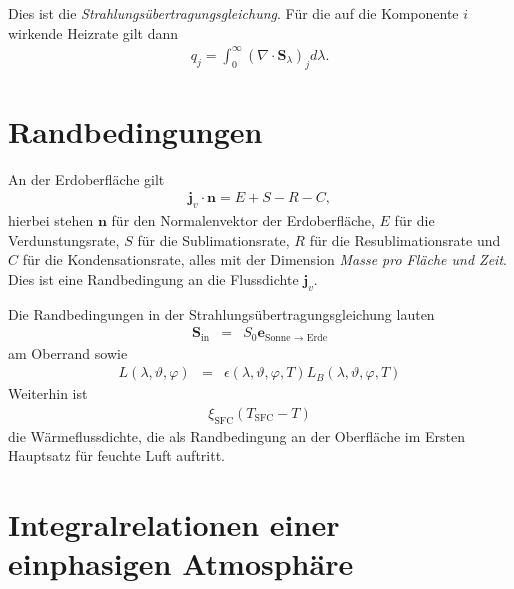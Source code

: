 \documentclass{book}
\begin{document}
%
Dies ist die \textit{Strahlungsübertragungsgleichung}. Für die auf die Komponente $i$ wirkende Heizrate gilt dann
%
\begin{eqnarray}
q_j = \int_{0}^\infty\left(\nabla\cdot\mathbf{S}_\lambda\right)_jd\lambda.
\end{eqnarray}
%
\section{Randbedingungen}
\label{sec:randbedingungen_diabatie}

An der Erdoberfläche gilt
%
\begin{eqnarray}
\mathbf{j}_v\cdot\mathbf{n} = E + S - R - C, 
\end{eqnarray}
%
hierbei stehen $\mathbf{n}$ für den Normalenvektor der Erdoberfläche, $E$ für die Verdunstungsrate, $S$ für die Sublimationsrate, $R$ für die Resublimationsrate und $C$ für die Kondensationsrate, alles mit der Dimension \textit{Masse pro Fläche und Zeit}. Dies ist eine Randbedingung an die Flussdichte $\mathbf{j}_v$.

Die Randbedingungen in der Strahlungsübertragungsgleichung lauten
%
\begin{eqnarray}
\mathbf{S}_{\text{in}} & = & S_0\mathbf{e}_{\text{Sonne $\to$ Erde}}
\end{eqnarray}
%
am Oberrand sowie
%
\begin{eqnarray}
L\left(\lambda, \vartheta, \varphi\right) & = & \epsilon\left(\lambda, \vartheta, \varphi, T\right)L_B\left(\lambda, \vartheta, \varphi, T\right)
\end{eqnarray}
%
Weiterhin ist
%
\begin{eqnarray}
\xi_{\text{SFC}}\left(T_{\text{SFC}} - T\right)
\end{eqnarray}
%
die Wärmeflussdichte, die als Randbedingung an der Oberfläche im Ersten Hauptsatz für feuchte Luft auftritt.

\section{Integralrelationen einer einphasigen Atmosphäre}
\label{sec:integralrelationen_einer_einphasigen_atmosphäre}
\end{document}
